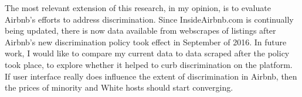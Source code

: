 \documentclass[11pt, oneside]{article}
\begin{document}
The most relevant extension of this research, in my opinion, is to evaluate Airbnb's efforts to address discrimination. Since InsideAirbnb.com is continually being updated, there is now data available from webscrapes of listings after Airbnb's new discrimination policy took effect in September of 2016. In future work, I would like to compare my current data to data scraped after the policy took place, to explore whether it helped to curb discrimination on the platform. If user interface really does influence the extent of discrimination in Airbnb, then the prices of minority and White hosts should start converging. 




\begin{comment} %
\section{GARBAGE SECTION: Alternative Hypotheses} %

In this section, I consider alternative explanations for the price differences I found between minority and white hosts. In particular, I examine three relevant mechanisms that are not discrimination that could explain my results. I will then argue that these mechanisms would be insufficient in doing so. 

\textbf{2. Price observed during the scrape is not the price normally set by hosts or observed by guests}

The prices I used in my data analysis were prices from one particular day in 2015-2016. I ran my regressions on the assumption that this is the price that hosts set and that guests observe that drives guest booking decisions and host revenue outcomes. However, imagine that for one day, all of the white people on Airbnb raise their prices. That day, the scrape happens to take place, and the next day, the prices of White hosts all go back down. Then, the price that I observed in my data for White hosts would be high even though it doesn't incorporate real demand differences between races nor is tied to listing characteristics or host quality. While this may seem like an unlikely scenario, price hikes for the weekend or for holidays like July 4th or New Year's may give rise to a similar situation if Black hosts change their prices differently than White hosts. 

TO-DO - Check price time series data to prove that prices don't move around that much during the month/year. 


\end{comment}
\end{document}
